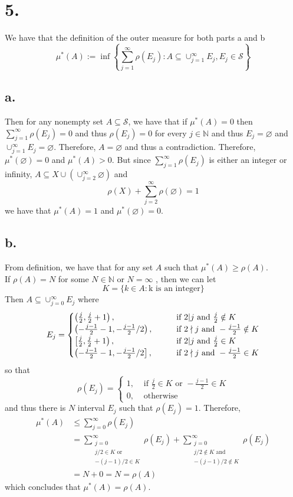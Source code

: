 \documentclass[11pt]{article}
\theoremstyle{mystyle}
\theoremstyle{definition}
\begin{document}
\section*{5.}
We have that the definition of the outer measure for both parts a and b
\[
  \mu^*(A) := \inf \left\{\sum_{j=1}^\infty \rho(E_j): A \subseteq \cup_{j=1}^\infty E_j, E_j \in \mathcal{S} \right\}
\]
\subsection*{a.}
Then for any nonempty set $A \subseteq \mathcal{S}$, we have that if $\mu^*(A) = 0$ then $\sum_{j=1}^\infty \rho(E_j) = 0$ and thus $\rho(E_j) = 0$ for every $j \in \mathbb{N}$ and thus $E_j = \varnothing$ and $\cup_{j=1}^\infty E_j = \varnothing$. Therefore, $A = \varnothing$ and thus a contradiction. Therefore, $\mu^*(\varnothing) = 0$ and $ \mu^*(A) > 0$. But since $\sum_{j=1}^\infty \rho(E_j)$ is either an integer or infinity, $A \subseteq X \cup (\cup_{j=2}^\infty \varnothing)$ and 
\[
  \rho(X) + \sum_{j=2}^\infty \rho(\varnothing) = 1
\]
we have that $\mu^*(A) = 1$ and $\mu^*(\varnothing) = 0$. 
\subsection*{b.}
From definition, we have that for any set $A$ such that $\mu^*(A) \ge \rho(A)$. \\ 
If $\rho(A) = N$ for some $N \in \mathbb{N}$ or $N = \infty$ , then we can let 
\[
  K = \{k \in A: \text{k is an integer} \}
\]
Then $A \subseteq \cup_{j=0}^\infty E_j$ where 
\[
  E_j = 
  \begin{cases}
    \left(\frac{j}{2},\frac{j}{2} + 1\right), \indent &\text{ if } 2|j \text{ and } \frac{j}{2} \notin K\\
    \left(-\frac{j-1}{2} -1,-\frac{j-1}{2}/2\right), \indent &\text{ if } 2\nmid j \text{ and } -\frac{j-1}{2} \notin K \\
    \left[\frac{j}{2},\frac{j}{2} + 1\right), \indent &\text{ if } 2|j \text{ and } \frac{j}{2} \in K \\
    \left(-\frac{j-1}{2} -1,-\frac{j-1}{2}/2\right], \indent &\text{ if } 2\nmid j \text{ and } -\frac{j-1}{2} \in K \\
  \end{cases}
\]
so that 
\[
  \rho(E_j) = 
  \begin{cases}
    1, &\text{ if } \frac{j}{2} \in K \text{ or } -\frac{j-1}{2} \in K \\
    0, &\text{ otherwise}
  \end{cases}
\]
and thus there is $N$ interval $E_j$ such that $\rho(E_j) = 1$. Therefore,
\begin{align*}  
  \mu^*(A) 
  &\le \sum_{j=0}^\infty \rho(E_j) \\
  &=  \sum_{\substack{j=0 \\ j/2 \in K \text{ or } \\ -(j-1)/2 \in K}}^\infty \rho(E_j) 
  +  \sum_{\substack{j=0 \\ j/2 \notin K \text{ and } \\ -(j-1)/2 \notin K}}^\infty \rho(E_j) \\
  &= N + 0 = N = \rho(A) 
\end{align*}
which concludes that $\mu^*(A) = \rho(A)$. 
\end{document}

